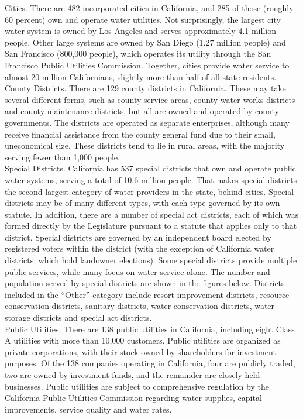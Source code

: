 \documentclass{article}
\begin{document}
Cities.  There are 482 incorporated cities in California, and 285 of those (roughly 60 percent) own and operate water utilities. Not surprisingly, the largest city water system is owned by Los Angeles and serves approximately 4.1 million people. Other large systems are owned by San Diego (1.27 million people) and San Francisco (800,000 people), which operates its utility through the San Francisco Public Utilities Commission. Together, cities provide water service to almost 20 million Californians, slightly more than half of all state residents.\\

County Districts.  There are 129 county districts in California. These may take several different forms, such as county service areas, county water works districts and county maintenance districts, but all are owned and operated by county governments. The districts are operated as separate enterprises, although many receive financial assistance from the county general fund due to their small, uneconomical size. These districts tend to lie in rural areas, with the majority serving fewer than 1,000 people.\\

Special Districts.  California has 537 special districts that own and operate public water systems, serving a total of 10.6 million people. That makes special districts the second-largest category of water providers in the state, behind cities. Special districts may be of many different types, with each type governed by its own statute. In addition, there are a number of special act districts, each of which was formed directly by the Legislature pursuant to a statute that applies only to that district. Special districts are governed by an independent board elected by registered voters within the district (with the exception of California water districts, which hold landowner elections). Some special districts provide multiple public services, while many focus on water service alone. The number and population served by special districts are shown in the figures below.  Districts included in the “Other” category include resort improvement districts, resource conservation districts, sanitary districts, water conservation districts, water storage districts and special act districts.\\

Public Utilities.  There are 138 public utilities in California, including eight Class A utilities with more than 10,000 customers. Public utilities are organized as private corporations, with their stock owned by shareholders for investment purposes. Of the 138 companies operating in California, four are publicly traded, two are owned by investment funds, and the remainder are closely-held businesses. Public utilities are subject to comprehensive regulation by the California Public Utilities Commission regarding water supplies, capital improvements, service quality and water rates.\\
\end{document}
